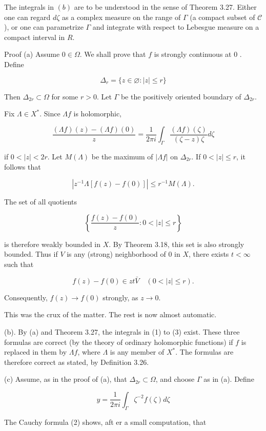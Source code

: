 \documentclass[10pt]{article}
\begin{document}
The integrals in $(b)$ are to be understood in the sense of Theorem 3.27. Either one can regard $d \zeta$ as a complex measure on the range of $\Gamma$ (a compact subset of $\mathscr{C}$ ), or one can parametrize $\Gamma$ and integrate with respect to Lebesgue measure on a compact interval in $R$.

Proof (a) Assume $0 \in \Omega$. We shall prove that $f$ is strongly continuous at 0 .
Define

$$
\Delta_{r}=\{z \in \varnothing:|z| \leq r\}
$$

Then $\Delta_{2 r} \subset \Omega$ for some $r>0$. Let $\Gamma$ be the positively oriented boundary of $\Delta_{2 r}$.

Fix $\Lambda \in X^{*}$. Since $\Lambda f$ is holomorphic,

$$
\frac{(\Lambda f)(z)-(\Lambda f)(0)}{z}=\frac{1}{2 \pi i} \int_{\Gamma} \frac{(\Lambda f)(\zeta)}{(\zeta-z) \zeta} d \zeta
$$

if $0<|z|<2 r$. Let $M(\Lambda)$ be the maximum of $|\Lambda f|$ on $\Delta_{2 r}$. If $0<|z| \leq r$, it follows that

$$
\left|z^{-1} \Lambda[f(z)-f(0)]\right| \leq r^{-1} M(\Lambda) .
$$

The set of all quotients

$$
\left\{\frac{f(z)-f(0)}{z}: 0<|z| \leq r\right\}
$$

is therefore weakly bounded in $X$. By Theorem 3.18, this set is also strongly bounded. Thus if $V$ is any (strong) neighborhood of 0 in $X$, there exists $t<\infty$ such that

$$
f(z)-f(0) \in z t \bar{V} \quad(0<|z| \leq r) .
$$

Consequently, $f(z) \rightarrow f(0)$ strongly, as $z \rightarrow 0$.

This was the crux of the matter. The rest is now almost automatic.

(b). By (a) and Theorem 3.27, the integrals in (1) to (3) exist. These three formulas are correct (by the theory of ordinary holomorphic functions) if $f$ is replaced in them by $\Lambda f$, where $\Lambda$ is any member of $X^{*}$. The formulas are therefore correct as stated, by Definition 3.26.

(c) Assume, as in the proof of (a), that $\Delta_{2 r} \subset \Omega$, and choose $\Gamma$ as in (a). Define

$$
y=\frac{1}{2 \pi i} \int_{\Gamma} \zeta^{-2} f(\zeta) d \zeta
$$

The Cauchy formula (2) shows, aft er a small computation, that
\end{document}
